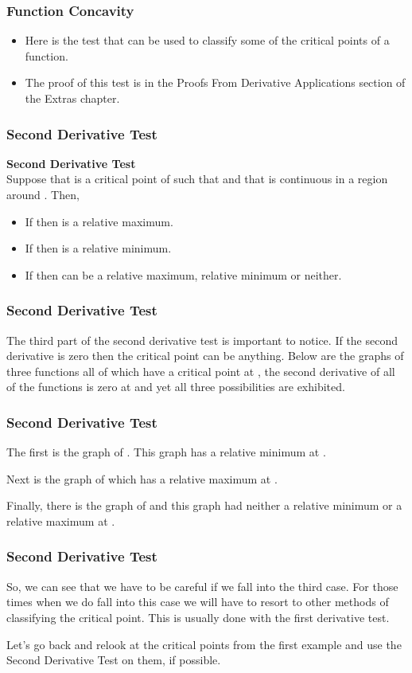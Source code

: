 \documentclass{beamer}
\begin{document}
\begin{frame} 
	\frametitle{Function Concavity}
\begin{itemize}
\item Here is the test that can be used to classify some of the critical points of a function.  
\item The proof of this test is in the Proofs From Derivative Applications section of the Extras chapter.
\end{itemize}

\end{frame}
\begin{frame} 
\frametitle{Second Derivative Test} 
\textbf{ Second Derivative Test }\\
 Suppose that  is a critical point of  such that  and that  is continuous in a region around .  Then,
 \begin{itemize}
\item If  then  is a relative maximum.
\item If  then  is a relative minimum.
\item If  then  can be a relative maximum, relative minimum or neither.
\end{itemize}
\end{frame}
\begin{frame} 
\frametitle{Second Derivative Test} 
 The third part of the second derivative test is important to notice.  If the second derivative is zero then the critical point can be anything.  Below are the graphs of three functions all of which have a critical point at , the second derivative of all of the functions is zero at  and yet all three possibilities are exhibited.
\end{frame}
\begin{frame} 
\frametitle{Second Derivative Test} 
 The first is the graph of .  This graph has a relative minimum at .
 
 Next is the graph of  which has a relative maximum at .
 
 Finally, there is the graph of  and this graph had neither a relative minimum or a relative maximum at .
\end{frame}
\begin{frame} 
\frametitle{Second Derivative Test} 
 So, we can see that we have to be careful if we fall into the third case.  For those times when we do fall into this case we will have to resort to other methods of classifying the critical point.  This is usually done with the first derivative test.
 
 Let’s go back and relook at the critical points from the first example and use the Second Derivative Test on them, if possible.
\end{frame}
\end{document}
